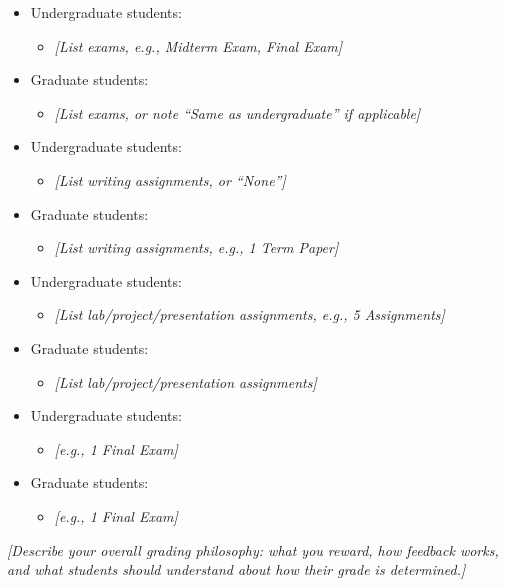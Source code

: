 \begin{itemize}
\item Undergraduate students:
\begin{itemize}
\item \textit{[List exams, e.g., Midterm Exam, Final Exam]}
\end{itemize}
\item Graduate students:
\begin{itemize}
\item \textit{[List exams, or note ``Same as undergraduate'' if applicable]}
\end{itemize}
\end{itemize}
\begin{itemize}
\item Undergraduate students:
\begin{itemize}
\item \textit{[List writing assignments, or ``None'']}
\end{itemize}
\item Graduate students:
\begin{itemize}
\item \textit{[List writing assignments, e.g., 1 Term Paper]}
\end{itemize}
\end{itemize}
\begin{itemize}
\item Undergraduate students:
\begin{itemize}
\item \textit{[List lab/project/presentation assignments, e.g., 5 Assignments]}
\end{itemize}
\item Graduate students:
\begin{itemize}
\item \textit{[List lab/project/presentation assignments]}
\end{itemize}
\end{itemize}
\begin{itemize}
\item Undergraduate students:
\begin{itemize}
\item \textit{[e.g., 1 Final Exam]}
\end{itemize}
\item Graduate students:
\begin{itemize}
\item \textit{[e.g., 1 Final Exam]}
\end{itemize}
\end{itemize}
\textit{[Describe your overall grading philosophy: what you reward, how feedback works, and what students should understand about how their grade is determined.]}

